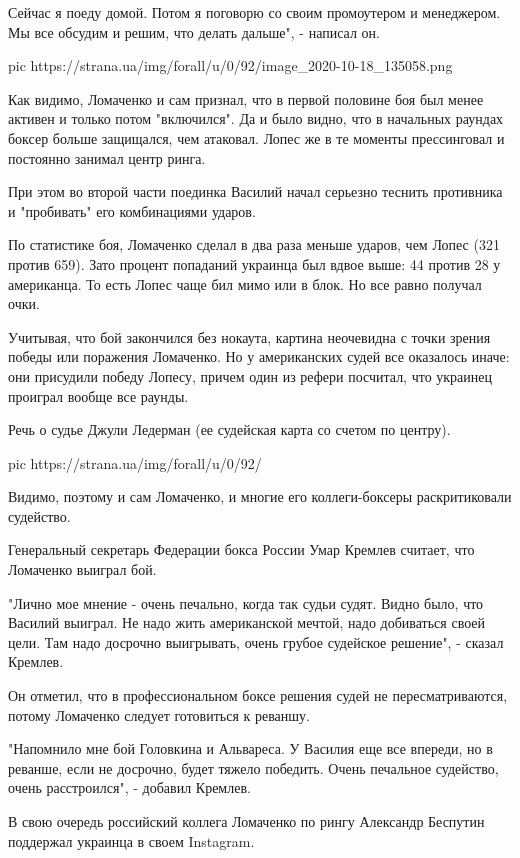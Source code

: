 Сейчас я поеду домой. Потом я поговорю со своим промоутером и менеджером. Мы
все обсудим и решим, что делать дальше", - написал он.

\ifcmt
pic https://strana.ua/img/forall/u/0/92/image_2020-10-18_135058.png
\fi

Как видимо, Ломаченко и сам признал, что в первой половине боя был менее
активен и только потом "включился". Да и было видно, что в начальных раундах
боксер больше защищался, чем атаковал. Лопес же в те моменты прессинговал и
постоянно занимал центр ринга. 

При этом во второй части поединка Василий начал серьезно теснить противника и
"пробивать" его комбинациями ударов.

По статистике боя, Ломаченко сделал в два раза меньше ударов, чем Лопес (321
против 659). Зато процент попаданий украинца был вдвое выше: 44 против 28 у
американца. То есть Лопес чаще бил мимо или в блок. Но все равно получал очки. 

Учитывая, что бой закончился без нокаута, картина неочевидна с точки зрения
победы или поражения Ломаченко. Но у американских судей все оказалось иначе:
они присудили победу Лопесу, причем один из рефери посчитал, что украинец
проиграл вообще все раунды. 

Речь о судье Джули Ледерман (ее судейская карта со счетом по центру).

\ifcmt
pic https://strana.ua/img/forall/u/0/92/%
\fi

Видимо, поэтому и сам Ломаченко, и многие его коллеги-боксеры раскритиковали
судейство. 

Генеральный секретарь Федерации бокса России Умар Кремлев считает, что
Ломаченко выиграл бой. 

"Лично мое мнение - очень печально, когда так судьи судят. Видно было, что
Василий выиграл. Не надо жить американской мечтой, надо добиваться своей цели.
Там надо досрочно выигрывать, очень грубое судейское решение", - сказал
Кремлев.

Он отметил, что в профессиональном боксе решения судей не пересматриваются,
потому Ломаченко следует готовиться к реваншу.

"Напомнило мне бой Головкина и Альвареса. У Василия еще все впереди, но в
реванше, если не досрочно, будет тяжело победить. Очень печальное судейство,
очень расстроился", - добавил Кремлев.

В свою очередь российский коллега Ломаченко по рингу Александр Беспутин
поддержал украинца в своем Instagram.

